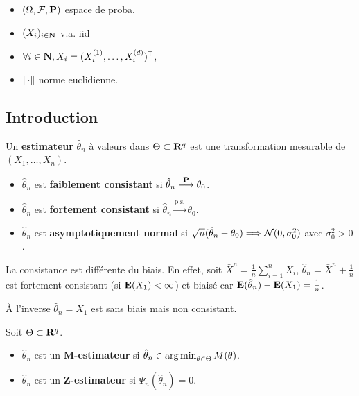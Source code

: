 \begin{note}
	\begin{itemize}
		\item[\textbullet] $(\Omega,\mathcal{F},\mathbf{P})$ espace de proba,
		\item[\textbullet] $(X_i)_{i \in \mathbf{N}}$ v.a. iid
		\item[\textbullet] $\forall i \in \mathbf{N}, X_i =  (X_i^{(1)},\ldots,X_i^{(d)}) ^\mathsf{T}$,
		\item[\textbullet] $\left\lVert\cdot\right\rVert$ norme euclidienne.
	\end{itemize}
\end{note}

\subsection{Introduction}

	\begin{defn}
		Un \textbf{estimateur} $\hat{\theta}_n$ à valeurs dans $\Theta \subset \mathbf{R}^q$ est une transformation mesurable de $(X_1,\ldots,X_n)$.
		\begin{itemize}
			\item[\textbullet] $\hat{\theta}_n$ est \textbf{faiblement consistant} si $\hat{\theta}_n \overset{\mathbf{P}}{\longrightarrow} \theta_0$.
			\item[\textbullet] $\hat{\theta}_n$ est \textbf{fortement consistant} si $\hat{\theta}_n \overset{\text{p.s.}}{\longrightarrow} \theta_0$.
			\item[\textbullet] $\hat{\theta}_n$ est \textbf{asymptotiquement normal} si $\sqrt{n}(\hat{\theta}_n - \theta_0) \Longrightarrow \mathcal{N}(0,\sigma_0^2)$ avec $\sigma_0^2 > 0$.
		\end{itemize}
	\end{defn}

	\begin{rem}
		La consistance est différente du biais.
		En effet, soit $\bar{X}^n = \frac{1}{n} \sum_{i = 1}^n X_i$, $\hat{\theta}_n = \bar{X}^n + \frac{1}{n}$ est fortement consistant (si $\mathbf{E}(X_1) < \infty$) et biaisé car $\mathbf{E}(\hat{\theta}_n) - \mathbf{E}(X_1) = \frac{1}{n}$.
		
		À l'inverse $\hat{\theta}_n = X_1$ est sans biais mais non consistant.
	\end{rem}
	
	\begin{defn}
		Soit $\Theta \subset \mathbf{R}^q$.
		\begin{itemize}
			\item[\textbullet] $\hat{\theta}_n$ est un \textbf{M-estimateur} si $\hat{\theta}_n \in \operatorname{arg\, min}_{\theta \in \Theta} M(\theta)$.
			\item[\textbullet] $\hat{\theta}_n$ est un \textbf{Z-estimateur} si $\Psi_n(\hat{\theta}_n) = 0$.
		\end{itemize}
	\end{defn}
	
